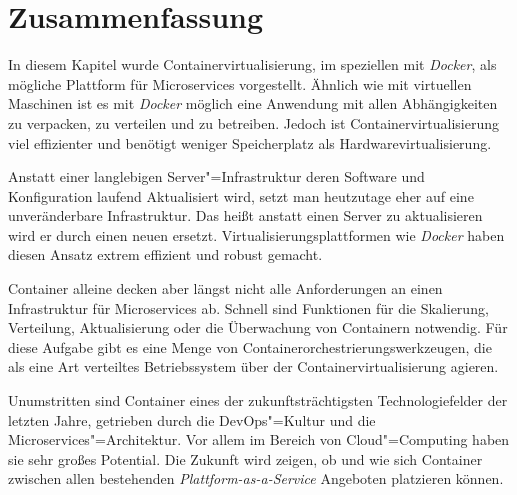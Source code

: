 \section{Zusammenfassung}

In diesem Kapitel wurde Containervirtualisierung, im speziellen mit \textit{Docker}, als mögliche Plattform für Microservices vorgestellt. Ähnlich wie mit virtuellen Maschinen ist es mit \textit{Docker} möglich eine Anwendung mit allen Abhängigkeiten zu verpacken, zu verteilen und zu betreiben. Jedoch ist Containervirtualisierung viel effizienter und benötigt weniger Speicherplatz als Hardwarevirtualisierung.

Anstatt einer langlebigen Server"=Infrastruktur deren Software und Konfiguration laufend Aktualisiert wird, setzt man heutzutage eher auf eine unveränderbare Infrastruktur. Das heißt anstatt einen Server zu aktualisieren wird er durch einen neuen ersetzt. Virtualisierungsplattformen wie \textit{Docker} haben diesen Ansatz extrem effizient und robust gemacht.

Container alleine decken aber längst nicht alle Anforderungen an einen Infrastruktur für Microservices ab. Schnell sind Funktionen für die Skalierung, Verteilung, Aktualisierung oder die Überwachung von Containern notwendig. Für diese Aufgabe gibt es eine Menge von Containerorchestrierungswerkzeugen, die als eine Art verteiltes Betriebssystem über der Containervirtualisierung agieren.

Unumstritten sind Container eines der zukunftsträchtigsten Technologiefelder der letzten Jahre, getrieben durch die DevOps"=Kultur und die Microservices"=Architektur. Vor allem im Bereich von Cloud"=Computing haben sie sehr großes Potential. Die Zukunft wird zeigen, ob und wie sich Container zwischen allen bestehenden \textit{Plattform-as-a-Service} Angeboten platzieren können. 